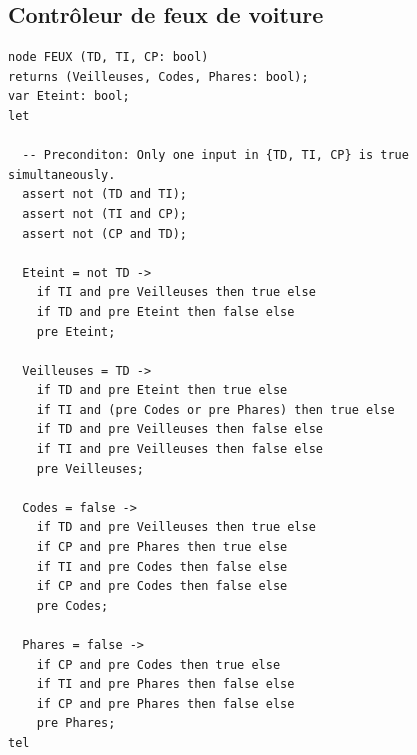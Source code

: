 \documentclass{article}
\begin{document}
    \subsection{Contrôleur de feux de voiture}
      \begin{lstlisting}
node FEUX (TD, TI, CP: bool)
returns (Veilleuses, Codes, Phares: bool);
var Eteint: bool;
let

  -- Preconditon: Only one input in {TD, TI, CP} is true simultaneously. 
  assert not (TD and TI);
  assert not (TI and CP);
  assert not (CP and TD);

  Eteint = not TD ->
    if TI and pre Veilleuses then true else
    if TD and pre Eteint then false else
    pre Eteint;

  Veilleuses = TD ->
    if TD and pre Eteint then true else
    if TI and (pre Codes or pre Phares) then true else
    if TD and pre Veilleuses then false else
    if TI and pre Veilleuses then false else
    pre Veilleuses;

  Codes = false ->
    if TD and pre Veilleuses then true else
    if CP and pre Phares then true else
    if TI and pre Codes then false else
    if CP and pre Codes then false else
    pre Codes;

  Phares = false ->
    if CP and pre Codes then true else
    if TI and pre Phares then false else
    if CP and pre Phares then false else
    pre Phares;
tel
      \end{lstlisting}    
\end{document}
